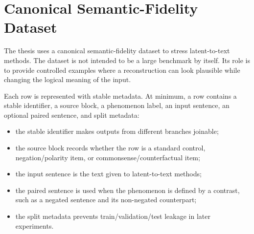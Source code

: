 \FloatBarrier

\section{Canonical Semantic-Fidelity Dataset}
\label{sec:method-canonical-dataset}

The thesis uses a canonical semantic-fidelity dataset to stress latent-to-text
methods. The dataset is not intended to be a large benchmark by itself. Its role
is to provide controlled examples where a reconstruction can look plausible
while changing the logical meaning of the input.

Each row is represented with stable metadata. At minimum, a row contains a
stable identifier, a source block, a phenomenon label, an input sentence, an
optional paired sentence, and split metadata:

\begin{itemize}
    \item the stable identifier makes outputs from different branches joinable;
    \item the source block records whether the row is a standard control,
    negation/polarity item, or commonsense/counterfactual item;
    \item the input sentence is the text given to latent-to-text methods;
    \item the paired sentence is used when the phenomenon is defined by a
    contrast, such as a negated sentence and its non-negated counterpart;
    \item the split metadata prevents train/validation/test leakage in later
    experiments.
\end{itemize}

